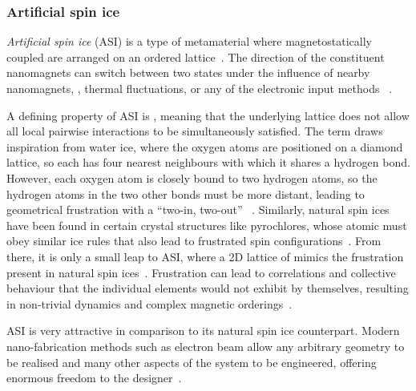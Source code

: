 \subsubsection{Artificial spin ice}\label{sec:1:ASI}
\textit{Artificial spin ice} (ASI) is a type of metamaterial where magnetostatically coupled  are arranged on an ordered lattice~\cite{RC_ASI,flatspin}.
The  direction of the constituent nanomagnets can switch between two states under the influence of nearby nanomagnets, , thermal fluctuations, or any of the electronic input methods ~\cite{CoerciveFieldReversal,BrownThermalFluctuations,SOT_FM_AFM,brataas2012current}. \par
A defining property of ASI is , meaning that the underlying lattice does not allow all local pairwise interactions to be simultaneously satisfied.
The term  draws inspiration from water ice, where the oxygen atoms are positioned on a diamond lattice, so each has four nearest neighbours with which it shares a hydrogen bond. %
However, each oxygen atom is closely bound to two hydrogen atoms, so the hydrogen atoms in the two other bonds must be more distant, leading to geometrical frustration with a ``two-in, two-out'' ~\cite{nisoli2013colloquium,ZeroPointEntropy,heyderman2013artificial,MagnetizationDynamicsASI}.
Similarly, natural spin ices have been found in certain crystal structures like pyrochlores, whose atomic  must obey similar ice rules that also lead to frustrated spin configurations~\cite{nisoli2013colloquium}.
From there, it is only a small leap to ASI, where a 2D lattice of  mimics the frustration present in natural spin ices~\cite{heyderman2013artificial}.
Frustration can lead to correlations and collective behaviour that the individual elements would not exhibit by themselves, resulting in non-trivial dynamics and complex magnetic orderings~\cite{AdvancesASI,ASI_computation,ApparentFMpinwheel}. \par
ASI is very attractive in comparison to its natural spin ice counterpart.
Modern nano-fabrication methods such as electron beam  allow any arbitrary geometry to be realised and many other aspects of the system to be engineered, offering enormous freedom to the designer~\cite{AdvancesASI,ASI_computation}.
